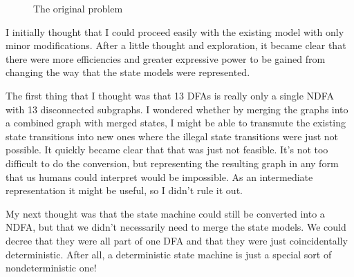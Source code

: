 \documentclass[a4paper]{article}
\begin{document}
\begin{figure}[ht]
	\begin{center}
	\end{center}

	\caption{The original problem}
	\label{fig:originalProblem}
\end{figure}

I initially thought that I could proceed easily with the existing model with
only minor modifications. After a little thought and exploration, it 
became clear that there were more efficiencies and greater expressive power to
be gained from changing the way that the state models were represented.

The first thing that I thought was that 13 DFAs is really only a
single NDFA with 13 disconnected subgraphs. I wondered whether by merging the
graphs into a combined graph with merged states, I might be able to transmute
the existing state transitions into new ones where the illegal state transitions
were just not possible. It quickly became clear that that was just not feasible.
It's not too difficult to do the conversion, but representing the resulting
graph in any form that us humans could interpret would be impossible. As an
intermediate representation it might be useful, so I didn't rule it out.

My next thought was that the state machine could still be converted into a
NDFA, but that we didn't necessarily need to merge the state models. We could
decree that they were all part of one DFA and that they were just coincidentally
deterministic. After all, a deterministic state machine is just a special sort of
nondeterministic one!
\end{document}
